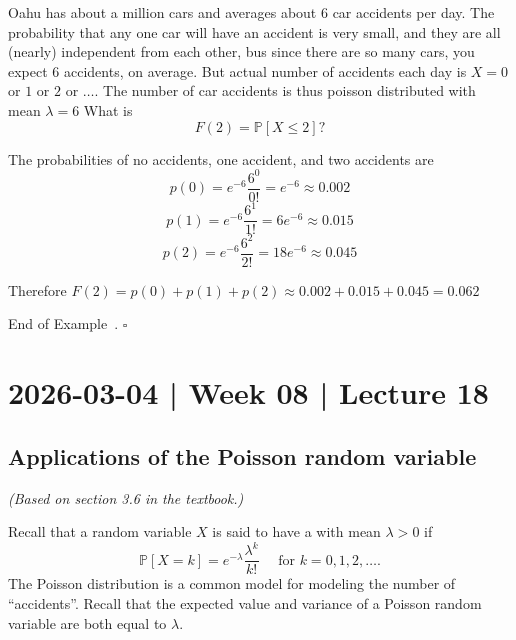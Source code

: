 \documentclass[10pt]{article}
\theoremstyle{definition}
\newtheorem{example}[theorem]{Example}
\renewenvironment{example}
{\begin{oldexample}}
  {\par\smallskip\hfill   End of Example~\theexample. $\square$    \par\end{oldexample}}
\newcommand{\1}[1]{\textbf{1}_{\left[#1\right]}} %
\def\P{\mathbb{P}} %
\newcommand{\dempfcolor}[1]{{\color{RoyalBlue}#1}}
\newcommand{\demph}[1]{\dempfcolor{{\sl \textbf{#1}}}}
\begin{document}
\begin{example}
  Oahu has about a million cars and averages about 6 car accidents per day. The probability that any one
  car will have an accident is very small, and they are all (nearly) independent from each other, bus
  since there are so many cars, you expect 6 accidents, on average. But actual number of accidents each
  day is $X=0$ or $1$ or $2$ or $\ldots$. The number of car accidents is thus poisson distributed with
  mean $\lambda=6$ What is
  \begin{equation*}
    F(2) = \P\left[X \leq 2\right]?
  \end{equation*}
  
  The probabilities of no accidents, one accident, and two accidents
  are
  \begin{equation*}
    p(0) = e^{-6} \frac{6^{0}}{0!} = e^{-6} \approx 0.002
  \end{equation*}
  \begin{equation*}
    p(1) = e^{-6} \frac{6^{1}}{1!} = 6e^{-6} \approx 0.015
  \end{equation*}
  \begin{equation*}
    p(2) = e^{-6} \frac{6^{2}}{2!} = 18e^{-6} \approx 0.045
  \end{equation*}

  Therefore $F(2) = p(0)+p(1)+p(2)\approx 0.002+0.015+0.045  = 0.062$
\end{example}


\newpage

\section{2026-03-04 | Week 08 | Lecture 18}
\subsection{Applications of the Poisson random variable}
\textit{(Based on section 3.6 in the textbook.)}


Recall that a random variable $X$ is said to have a \demph{Poisson
  distribution} with mean $\lambda>0$ if
\begin{equation*}
  \P\left[X = k \right] = e^{-\lambda} \frac{\lambda^{k}}{k!} \quad \text{ for }k=0,1,2,\ldots.
\end{equation*}
The Poisson distribution is a common model for modeling the number of
``accidents''. Recall that the expected value and variance of a Poisson random
variable are both equal to $\lambda$. 
\end{document}
